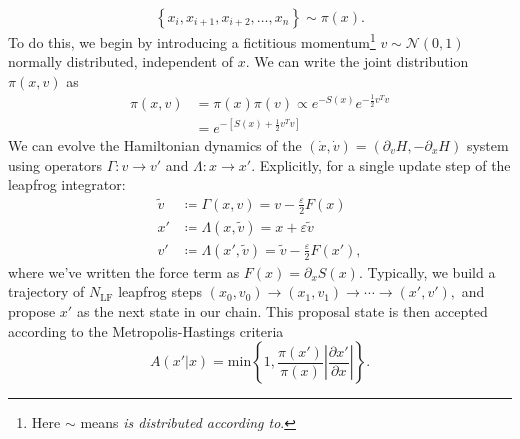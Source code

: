 \documentclass[a4paper,11pt]{article}
\begin{document}
%
%
\begin{equation}
\left\{x_{i}, x_{i+1}, x_{i+2}, \ldots, x_{n}\right\} \sim \pi(x).
\end{equation}
%
To do this, we begin by introducing a fictitious momentum\footnote{Here $\sim$
means \textit{is distributed according to}.} $v \sim \mathcal{N}(0, 1)$
normally distributed, independent of $x$.
%
We can write the joint distribution $\pi(x, v)$ as
%
\begin{align}
\pi(x, v) &= \pi(x) \pi(v) \propto e^{-S(x)} e^{-\frac{1}{2} v^{T}v} \\
&= e^{-\left[S(x) + \frac{1}{2} v^{T} v \right]}
\end{align}
%
We can evolve the Hamiltonian dynamics of the $(\dot{x}, \dot{v}) =
(\partial_{v} H, -\partial_{x} H)$ system using operators $\Gamma: v
\rightarrow v'$ and $\Lambda: x \rightarrow x'$.
%
Explicitly, for a single update step of the leapfrog integrator:
%
\begin{align}
\tilde{v} &\coloneqq \Gamma(x, v) = v - \frac{\varepsilon}{2} F(x) \\
x' &\coloneqq \Lambda(x, \tilde{v}) = x + \varepsilon \tilde{v} \\
v' &\coloneqq \Lambda(x', \tilde{v}) = \tilde{v} - \frac{\varepsilon}{2} F(x'),
\end{align}
%
where we've written the force term as $F(x) = \partial_{x}S(x)$.
%
Typically, we build a trajectory of $N_{\mathrm{LF}}$ leapfrog steps $(x_{0}, v_{0}) \rightarrow (x_{1}, v_{1}) \rightarrow \cdots \rightarrow (x', v'),$ and propose $x'$ as the next state in our chain.
%
%
This proposal state is then accepted according to the Metropolis-Hastings
criteria~\cite{robert_metropolis-hastings_2016}
%
\begin{equation}
A(x'|x) = \mathrm{min}\left\{{1, \frac{\pi(x')}{\pi(x)} \left| \frac{\partial x'}{\partial x} \right|}\right\}.
\end{equation}
%
\end{document}
